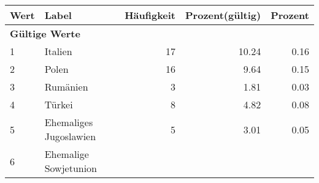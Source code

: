      \begin{longtable}{lXrrr}
     \toprule
     \textbf{Wert} & \textbf{Label} & \textbf{Häufigkeit} & \textbf{Prozent(gültig)} & \textbf{Prozent} \\
     \endhead
     \midrule
     \multicolumn{5}{l}{\textbf{Gültige Werte}}\\

     1 &
     \multicolumn{1}{X}{ Italien   } &


       \num{17} &
       \num[round-mode=places,round-precision=2]{10.24} &
         \num[round-mode=places,round-precision=2]{0.16} \\

     2 &
     \multicolumn{1}{X}{ Polen   } &


       \num{16} &
       \num[round-mode=places,round-precision=2]{9.64} &
         \num[round-mode=places,round-precision=2]{0.15} \\

     3 &
     \multicolumn{1}{X}{ Rumänien   } &


       \num{3} &
       \num[round-mode=places,round-precision=2]{1.81} &
         \num[round-mode=places,round-precision=2]{0.03} \\

     4 &
     \multicolumn{1}{X}{ Türkei   } &


       \num{8} &
       \num[round-mode=places,round-precision=2]{4.82} &
         \num[round-mode=places,round-precision=2]{0.08} \\

     5 &
     \multicolumn{1}{X}{ Ehemaliges Jugoslawien   } &


       \num{5} &
       \num[round-mode=places,round-precision=2]{3.01} &
         \num[round-mode=places,round-precision=2]{0.05} \\

     6 &
     \multicolumn{1}{X}{ Ehemalige Sowjetunion   } &



\end{longtable}

